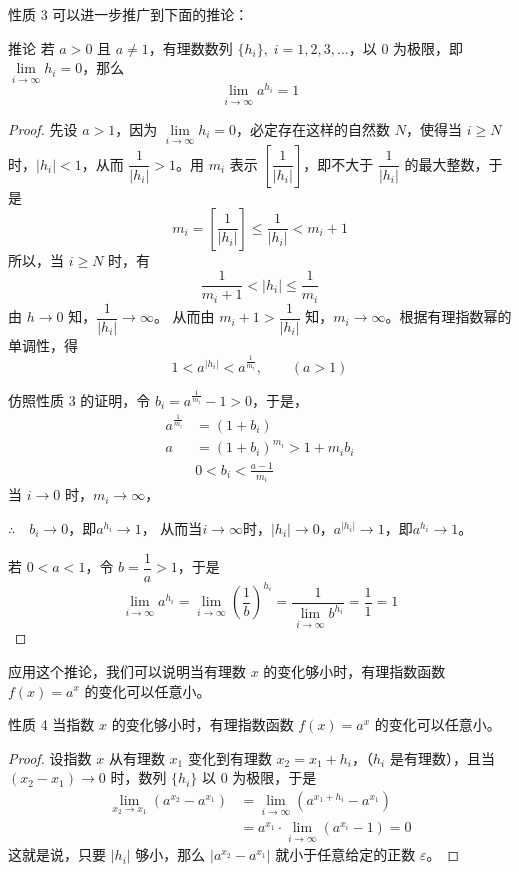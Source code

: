 性质 3 可以进一步推广到下面的推论：

\begin{Deduction}{推论}
若 $a>0$ 且 $a\ne 1$，有理数数列 $\{h_i\},\; i=1,2,3,\ldots$，以 0 为极限，即 $\lim\limits_{i\to\infty}h_i=0$，那么
\[\lim_{i\to\infty}a^{h_i}=1\]
\end{Deduction}

\begin{proof}
先设 $a>1$，因为 $\lim\limits_{i\to\infty}h_i=0$，必定存在这样的自然数 $N$，使得当 $i\geqslant N$ 时，$|h_i|<1$，从而 $\dfrac{1}{|h_i|}>1$。用 $m_i$ 表示 $\left[\dfrac{1}{|h_i|}\right]$，即不大于 $\dfrac{1}{|h_i|}$ 的最大整数，于是
\begin{equation}
  m_i=\left[\frac{1}{|h_i|}\right]\leqslant\frac{1}{|h_i|}<m_i+1
\end{equation}
所以，当 $i\geqslant N$ 时，有
\[\frac{1}{m_i+1}<|h_i|\le\frac{1}{m_i}\]
由 $h\to 0$ 知，$\dfrac{1}{|h_i|}\to \infty$。 从而由 $m_i+1>\dfrac{1}{|h_i|}$ 知，$m_i\to\infty$。根据有理指数幂的单调性，得
\[1<a^{|h_i|}<a^{\tfrac{1}{m_i}},\qquad (a>1)\]

仿照性质 3 的证明，令 $b_i=a^{\tfrac{1}{m_i}}-1>0$，于是，
\[\begin{split}
  a^{\tfrac{1}{m_i}}&=(1+b_i)\\
  a&=(1+b_i)^{m_i}>1+m_ib_i\\
  & 0<b_i<\frac{a-1}{m_i}
\end{split}\]
当 $i\to 0$ 时，$m_i\to \infty$，

$\therefore\quad b_i\to 0$，即$a^{h_i}\to 1$， 从而当$i\to \infty$时，$|h_i|\to 0$，$a^{|h_i|}\to 1$，即$a^{h_i}\to 1$。

若 $0<a<1$，令 $b=\dfrac{1}{a}>1$，于是
\[\lim_{i\to \infty} a^{h_i}=\lim_{i\to \infty} \left(\frac{1}{b}\right)^{h_i}=\frac{1}{\lim\limits_{i\to \infty} b^{h_i}}=\frac{1}{1}=1\]
\end{proof}

应用这个推论，我们可以说明当有理数 $x$ 的变化够小时，有理指数函数 $f(x)=a^x$ 的变化可以任意小。

\begin{Theorem}{性质 4}
当指数 $x$ 的变化够小时，有理指数函数 $f(x)=a^x$ 的变化可以任意小。
\end{Theorem}

\begin{proof}
设指数 $x$ 从有理数 $x_1$ 变化到有理数 $x_2=x_1+h_i$，（$h_i$ 是有理数），且当 $(x_2-x_1)\to 0$ 时，数列 $\{h_i\}$ 以 0 为极限，于是
\[\begin{split}
  \lim_{x_2\to x_1}\left(a^{x_2}-a^{x_1}\right)&=\lim_{i\to \infty}\left(a^{x_1+h_i}-a^{x_1}\right)\\
  &=a^{x_1}\cdot \lim_{i\to \infty}\left(a^{x_i}-1\right)=0
\end{split}\]
这就是说，只要 $|h_i|$ 够小，那么 $|a^{x_2}-a^{x_1}|$ 就小于任意给定的正数 $\varepsilon$。
\end{proof}


